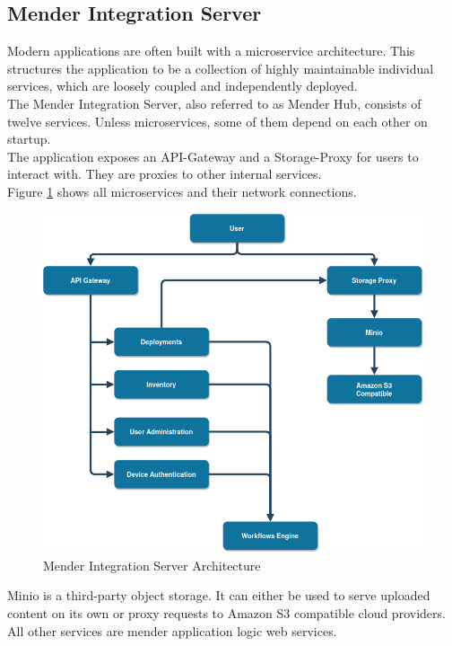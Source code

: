 \subsection{Mender Integration Server}
Modern applications are often built with a microservice architecture. This structures the application to be a collection of highly maintainable individual services, which are loosely coupled and independently deployed.\cite{microservicesio}\\
The Mender Integration Server, also referred to as Mender Hub, consists of twelve services. Unless microservices, some of them depend on each other on startup.\\
The application exposes an API-Gateway and a Storage-Proxy for users to interact with. They are proxies to other internal services.\cite{mender-github}\\
Figure \ref{fig:mender-integration} shows all microservices and their network connections.
\begin{figure}
    \centering
    \includegraphics[scale=0.5]{images/integration-app.png}
    \caption{Mender Integration Server Architecture}
    \label{fig:mender-integration}
\end{figure}
Minio is a third-party object storage. It can either be used to serve uploaded content on its own or proxy requests to Amazon S3 compatible cloud providers. All other services are mender application logic web services.

